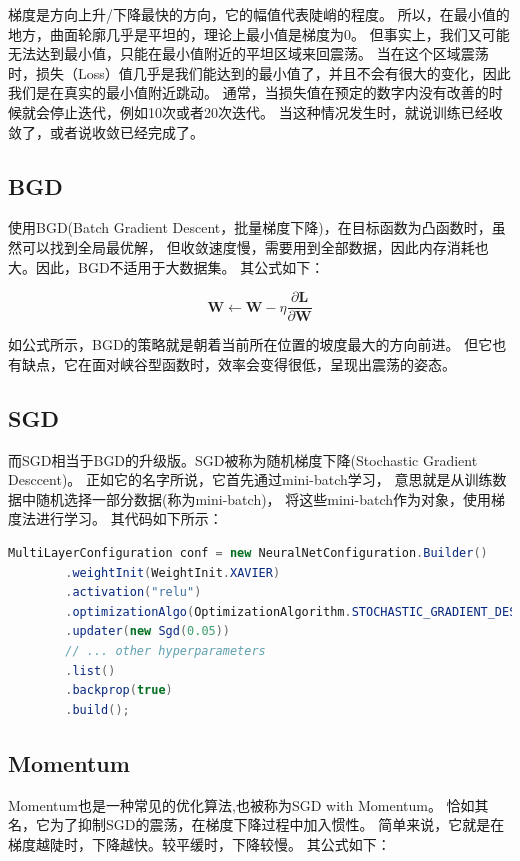 梯度是方向上升/下降最快的方向，它的幅值代表陡峭的程度。
所以，在最小值的地方，曲面轮廓几乎是平坦的，理论上最小值是梯度为0。
但事实上，我们又可能无法达到最小值，只能在最小值附近的平坦区域来回震荡。
当在这个区域震荡时，损失（Loss）值几乎是我们能达到的最小值了，并且不会有很大的变化，因此我们是在真实的最小值附近跳动。
通常，当损失值在预定的数字内没有改善的时候就会停止迭代，例如10次或者20次迭代。
当这种情况发生时，就说训练已经收敛了，或者说收敛已经完成了。

\subsection{BGD}
使用BGD(Batch Gradient Descent，批量梯度下降)，在目标函数为凸函数时，虽然可以找到全局最优解，
但收敛速度慢，需要用到全部数据，因此内存消耗也大。因此，BGD不适用于大数据集。
其公式如下：

\noindent
$$\boldsymbol{W} \leftarrow \boldsymbol{W}-\eta \frac{\partial \boldsymbol{L}}{\partial \boldsymbol{W}}$$

\noindent
如公式所示，BGD的策略就是朝着当前所在位置的坡度最大的方向前进。
但它也有缺点，它在面对峡谷型函数时，效率会变得很低，呈现出震荡的姿态。

\subsection{SGD}
而SGD相当于BGD的升级版。SGD被称为随机梯度下降(Stochastic Gradient Desccent)。
正如它的名字所说，它首先通过mini-batch学习，
意思就是从训练数据中随机选择一部分数据(称为mini-batch)，
将这些mini-batch作为对象，使用梯度法进行学习。
其代码如下所示：


\begin{lstlisting}[language=java]
	MultiLayerConfiguration conf = new NeuralNetConfiguration.Builder()
        .weightInit(WeightInit.XAVIER)
        .activation("relu")
        .optimizationAlgo(OptimizationAlgorithm.STOCHASTIC_GRADIENT_DESCENT)
        .updater(new Sgd(0.05))
        // ... other hyperparameters
        .list()
        .backprop(true)
        .build();
\end{lstlisting}


\subsection{Momentum}
Momentum也是一种常见的优化算法,也被称为SGD with Momentum。
恰如其名，它为了抑制SGD的震荡，在梯度下降过程中加入惯性。
简单来说，它就是在梯度越陡时，下降越快。较平缓时，下降较慢。
其公式如下：

